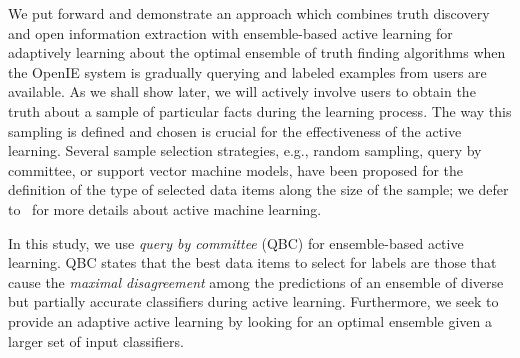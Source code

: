 We put forward and demonstrate an approach which combines truth discovery and open information extraction with ensemble-based active learning for adaptively learning about the optimal 
ensemble of truth finding algorithms when the OpenIE system is gradually querying and labeled examples from users are available.
As we shall show later, we will actively involve users to obtain the truth about a sample of particular facts during the learning process. The way this sampling is defined and
chosen is crucial for the effectiveness of the active learning. Several sample selection strategies, e.g., random sampling, query by committee, or support vector machine models,
have been proposed for the definition of the type of selected data items along the size of the sample; we defer to~\cite{burr12} for more details about active machine learning.

In this study, we use \emph{query by committee} (QBC) for ensemble-based active learning. QBC states that the best data items to select for labels are those that cause 
the \emph{maximal disagreement} among the predictions of an ensemble of diverse but partially accurate classifiers during active learning. Furthermore, we seek to provide
an adaptive active learning by looking for an optimal ensemble given a larger set of input classifiers.




\medskip

